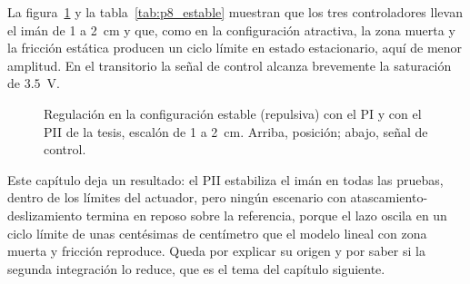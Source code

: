 La figura~\ref{fig:p8_estable} y la tabla~\ref{tab:p8_estable} muestran que los tres controladores llevan el imán de 1 a 2~cm y que, como en la configuración atractiva, la zona muerta y la fricción estática producen un ciclo límite en estado estacionario, aquí de menor amplitud. En el transitorio la señal de control alcanza brevemente la saturación de $3.5$~V.

\begin{figure}[ht]
    \centering
    
    \caption[Configuración estable]{Regulación en la configuración estable (repulsiva) con el PI y con el PII de la tesis, escalón de 1 a 2~cm. Arriba, posición; abajo, señal de control.}
    \label{fig:p8_estable}
\end{figure}

\FloatBarrier

Este capítulo deja un resultado: el PII estabiliza el imán en todas las pruebas, dentro de los límites del actuador, pero ningún escenario con atascamiento-deslizamiento termina en reposo sobre la referencia, porque el lazo oscila en un ciclo límite de unas centésimas de centímetro que el modelo lineal con zona muerta y fricción reproduce. Queda por explicar su origen y por saber si la segunda integración lo reduce, que es el tema del capítulo siguiente.
